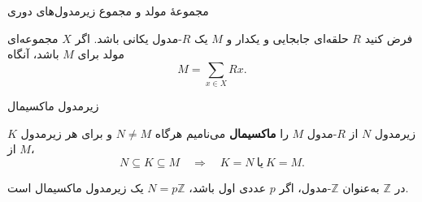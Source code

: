 \begin{frame}{مجموعهٔ مولد و مجموع زیرمدول‌های دوری}
    \label{lec04:generating-set-sum}
    \begin{remark}
        فرض کنید $R$ حلقه‌ای جابجایی و یکدار و $M$ یک $R$-مدول یکانی باشد.
        اگر $X$ مجموعه‌ای مولد برای $M$ باشد، آنگاه
        \[
            M=\sum_{x\in X}Rx.
        \]
    \end{remark}
\end{frame}

\begin{frame}{زیرمدول ماکسیمال}
    \label{lec04:maximal-submodule}
    \begin{definition}
        زیرمدول $N$ از $R$-مدول $M$ را \textbf{ماکسیمال} می‌نامیم هرگاه
        $N\neq M$ و برای هر زیرمدول $K$ از $M$،
        \[
            N\subseteq K\subseteq M
            \quad\Longrightarrow\quad K=N\ \text{یا}\ K=M.
        \]
    \end{definition}
    \begin{example}
        در $\mathbb Z$ به‌عنوان $\mathbb Z$-مدول، اگر $p$ عددی اول باشد،
        $N=p\mathbb Z$ یک زیرمدول ماکسیمال است.
    \end{example}
\end{frame}









